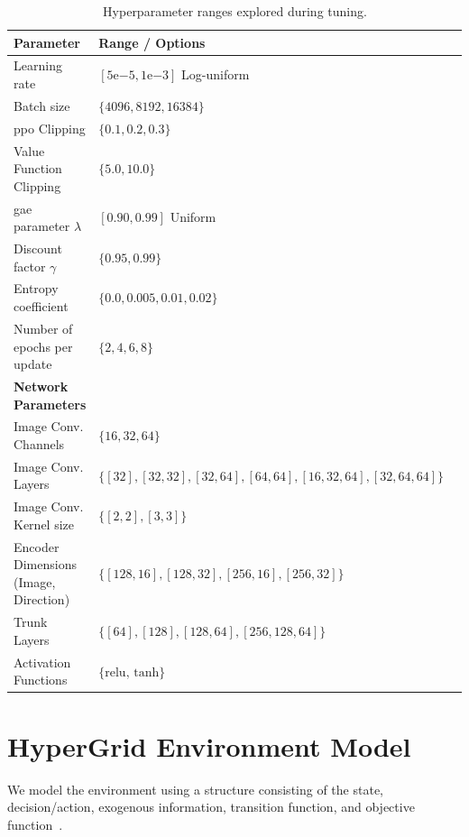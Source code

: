 \documentclass[]{jair}
\begin{document}
\begin{table}[H]
    \centering
    \caption{Hyperparameter ranges explored during tuning.}
    \label{tab:hparam-search}
    \begin{tabular}{l l l}
        \toprule
        \textbf{Parameter} & \textbf{Range / Options} \\
        \midrule
        Learning rate & \([5\mathrm{e}{-5}, 1\mathrm{e}{-3}]\) Log-uniform\\
        Batch size & \(\{4096, 8192, 16384\}\) \\
        \gls{ppo} Clipping & \(\{0.1, 0.2, 0.3\}\) \\
        Value Function Clipping & \(\{5.0, 10.0\}\) \\
        \gls{gae} parameter $\lambda$ & \([0.90, 0.99]\) Uniform \\
        Discount factor $\gamma$ & \(\{0.95, 0.99\}\) \\
        Entropy coefficient & \(\{0.0, 0.005, 0.01, 0.02\}\) \\
        Number of epochs per update & \(\{2, 4, 6, 8\}\) \\
        \midrule
        \textbf{Network Parameters} & \\
        \midrule
        Image Conv. Channels & \(\{16, 32, 64\}\) \\
        Image Conv. Layers & \(\{[32], [32, 32], [32, 64], [64, 64], [16, 32, 64], [32, 64, 64]\}\) \\
        Image Conv. Kernel size & \(\{[2,2],[3,3]\}\) \\
        Encoder Dimensions (Image, Direction) & \(\{[128, 16], [128, 32], [256, 16], [256, 32]\}\) \\
        Trunk Layers & \(\{[64], [128], [128, 64], [256, 128, 64]\}\) \\
        Activation Functions & \(\{\text{relu, tanh}\}\) \\
        \bottomrule
    \end{tabular}
\end{table}
\clearpage


\section{HyperGrid Environment Model}
\label{con2:app:env_model}

We model the environment using a structure consisting of the state, 
decision/action, exogenous information, transition function, and 
objective function~\cite{powell2022}.
\end{document}
